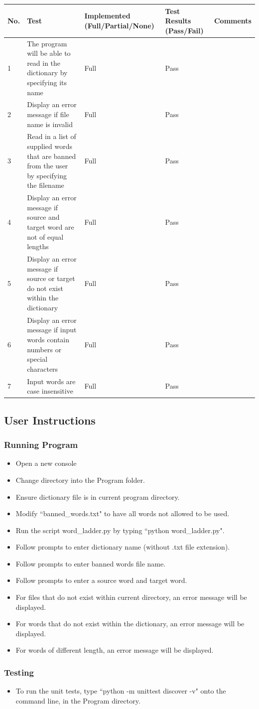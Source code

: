 \documentclass[12pt, a4]{report}
\begin{document}
		\begin{tabular}{ |p{0.5cm}|p{7.25cm}|p{2.5cm}|p{2.5cm}|p{2cm}| }
			\hline
			No. & Test & Implemented (Full/Partial/None) & Test Results (Pass/Fail) & Comments \\
			\hline
			1 & The program will be able to read in the dictionary by specifying its name & Full & Pass &  \\
			2 & Display an error message if file name is invalid & Full & Pass  & \\
			3 & Read in a list of supplied words that are banned from the user by specifying the filename & Full & Pass & \\
			4 & Display an error message if source and target word are not of equal lengths & Full & Pass & \\
			5 & Display an error message if source or target do not exist within the dictionary & Full & Pass & \\
			6 & Display an error message if input words contain numbers or special characters & Full & Pass & \\
			7 & Input words are case insensitive & Full & Pass & \\
			\hline
		\end{tabular}
	
	\newpage
	\subsection{User Instructions}
		\subsubsection{Running Program}
		\begin{itemize}
			\item Open a new console 
			\item Change directory into the Program folder.
			\item Ensure dictionary file is in current program directory.
			\item Modify ``banned\_words.txt" to have all words not allowed to be used.  
			\item Run the script word\_ladder.py by typing ``python word\_ladder.py".
			\item Follow prompts to enter dictionary name (without .txt file extension).
			\item Follow prompts to enter banned words file name. 
			\item Follow prompts to enter a source word and target word.
			\item For files that do not exist within current directory, an error message will be displayed.
			\item For words that do not exist within the dictionary, an error message will be displayed. 
			\item For words of different length, an error message will be displayed.
		\end{itemize}
		\subsubsection{Testing}
		\begin{itemize}
			\item To run the unit tests, type ``python -m unittest discover -v" onto the command line, in the Program directory. 
		\end{itemize}


	
\end{document}
